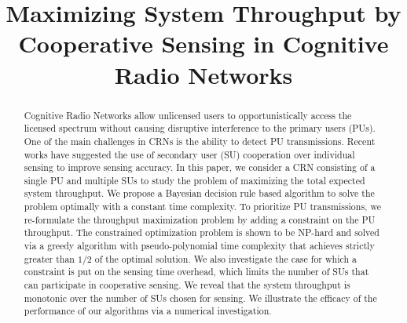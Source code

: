 \documentclass[conference]{IEEEtran}
\begin{document}
\title{Maximizing System Throughput by Cooperative Sensing in Cognitive Radio Networks}

\author{
\and
{}
\and
{}
\and
{}
}
\maketitle

\begin{abstract}
Cognitive Radio Networks allow unlicensed users to
opportunistically access the licensed spectrum without causing
disruptive interference to the primary users (PUs). One of the main
challenges in CRNs is the ability to detect PU transmissions. Recent
works have suggested the use of secondary user (SU) cooperation over
individual sensing to improve sensing accuracy. In this paper, we
consider a CRN consisting of a single PU and multiple SUs to study the
problem of maximizing the total expected system throughput. We propose
a Bayesian decision rule based algorithm to solve the problem
optimally with a constant time complexity. To prioritize PU
transmissions, we re-formulate the throughput maximization problem by
adding a constraint on the PU throughput. The constrained
optimization problem is shown to be NP-hard and solved via a greedy
algorithm with pseudo-polynomial time complexity that achieves strictly greater than $1/2$ of the optimal solution. We also investigate
the case for which a constraint is put on the sensing time overhead,
which limits the number of SUs that can participate in cooperative
sensing. We reveal that the system throughput is monotonic over the
number of SUs chosen for sensing. We illustrate the efficacy of the
performance of our algorithms via a numerical investigation.
\end{abstract}
\end{document}
